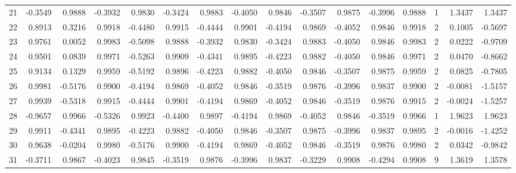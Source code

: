 \begin{tabular}{lrrrrrrrrrrrrrrr}
21  &     -0.3549 &  0.9888 & -0.3932 &  0.9830 & -0.3424 &  0.9883 & -0.4050 &  0.9846 & -0.3507 &  0.9875 &  -0.3996 &     0.9888 &      1 &                    1.3437 &                     1.3437 \\
22  &      0.8913 &  0.3216 &  0.9918 & -0.4480 &  0.9915 & -0.4444 &  0.9901 & -0.4194 &  0.9869 & -0.4052 &   0.9846 &     0.9918 &      2 &                    0.1005 &                    -0.5697 \\
23  &      0.9761 &  0.0052 &  0.9983 & -0.5098 &  0.9888 & -0.3932 &  0.9830 & -0.3424 &  0.9883 & -0.4050 &   0.9846 &     0.9983 &      2 &                    0.0222 &                    -0.9709 \\
24  &      0.9501 &  0.0839 &  0.9971 & -0.5263 &  0.9909 & -0.4341 &  0.9895 & -0.4223 &  0.9882 & -0.4050 &   0.9846 &     0.9971 &      2 &                    0.0470 &                    -0.8662 \\
25  &      0.9134 &  0.1329 &  0.9959 & -0.5192 &  0.9896 & -0.4223 &  0.9882 & -0.4050 &  0.9846 & -0.3507 &   0.9875 &     0.9959 &      2 &                    0.0825 &                    -0.7805 \\
26  &      0.9981 & -0.5176 &  0.9900 & -0.4194 &  0.9869 & -0.4052 &  0.9846 & -0.3519 &  0.9876 & -0.3996 &   0.9837 &     0.9900 &      2 &                   -0.0081 &                    -1.5157 \\
27  &      0.9939 & -0.5318 &  0.9915 & -0.4444 &  0.9901 & -0.4194 &  0.9869 & -0.4052 &  0.9846 & -0.3519 &   0.9876 &     0.9915 &      2 &                   -0.0024 &                    -1.5257 \\
28  &     -0.9657 &  0.9966 & -0.5326 &  0.9923 & -0.4400 &  0.9897 & -0.4194 &  0.9869 & -0.4052 &  0.9846 &  -0.3519 &     0.9966 &      1 &                    1.9623 &                     1.9623 \\
29  &      0.9911 & -0.4341 &  0.9895 & -0.4223 &  0.9882 & -0.4050 &  0.9846 & -0.3507 &  0.9875 & -0.3996 &   0.9837 &     0.9895 &      2 &                   -0.0016 &                    -1.4252 \\
30  &      0.9638 & -0.0204 &  0.9980 & -0.5176 &  0.9900 & -0.4194 &  0.9869 & -0.4052 &  0.9846 & -0.3519 &   0.9876 &     0.9980 &      2 &                    0.0342 &                    -0.9842 \\
31  &     -0.3711 &  0.9867 & -0.4023 &  0.9845 & -0.3519 &  0.9876 & -0.3996 &  0.9837 & -0.3229 &  0.9908 &  -0.4294 &     0.9908 &      9 &                    1.3619 &                     1.3578 \\

\end{tabular}
